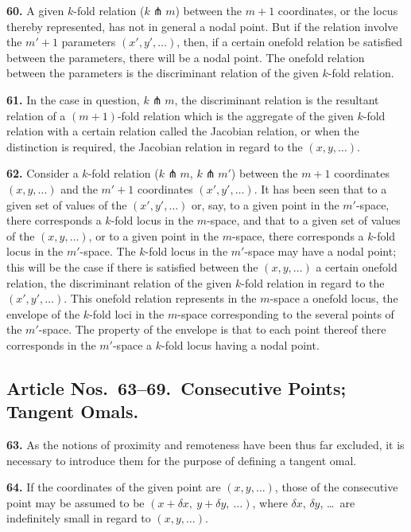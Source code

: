 \documentclass[11pt,a4paper]{article}
\theoremstyle{definition}
\begin{document}
\noindent\textbf{60.} A given $k$-fold relation ($k\pitchfork m$) between the $m+1$ coordinates, or the locus thereby represented, has not in general a nodal point. But if the relation involve the $m'+1$ parameters $(x',y',\ldots)$, then, if a certain onefold relation be satisfied between the parameters, there will be a nodal point. The onefold relation between the parameters is the discriminant relation of the given $k$-fold relation.

\noindent\textbf{61.} In the case in question, $k\pitchfork m$, the discriminant relation is the resultant relation of a $(m+1)$-fold relation which is the aggregate of the given $k$-fold relation with a certain relation called the Jacobian relation, or when the distinction is required, the Jacobian relation in regard to the $(x,y,\ldots)$.

\noindent\textbf{62.} Consider a $k$-fold relation ($k\pitchfork m$, $k\pitchfork m'$) between the $m+1$ coordinates $(x,y,\ldots)$ and the $m'+1$ coordinates $(x',y',\ldots)$. It has been seen that to a given set of values of the $(x',y',\ldots)$ or, say, to a given point in the $m'$-space, there corresponds a $k$-fold locus in the $m$-space, and that to a given set of values of the $(x,y,\ldots)$, or to a given point in the $m$-space, there corresponds a $k$-fold locus in the $m'$-space. The $k$-fold locus in the $m'$-space may have a nodal point; this will be the case if there is satisfied between the $(x,y,\ldots)$ a certain onefold relation, the discriminant relation of the given $k$-fold relation in regard to the $(x',y',\ldots)$. This onefold relation represents in the $m$-space a onefold locus, the envelope of the $k$-fold loci in the $m$-space corresponding to the several points of the $m'$-space. The property of the envelope is that to each point thereof there corresponds in the $m'$-space a $k$-fold locus having a nodal point.

\subsection*{Article Nos.\ 63--69.\ Consecutive Points; Tangent Omals.}

\setcounter{page}{468}

\noindent\textbf{63.} As the notions of proximity and remoteness have been thus far excluded, it is necessary to introduce them for the purpose of defining a tangent omal.

\noindent\textbf{64.} If the coordinates of the given point are $(x,y,\ldots)$, those of the consecutive point may be assumed to be $(x+\delta x,\ y+\delta y,\ \ldots)$, where $\delta x$, $\delta y$, \ldots\ are indefinitely small in regard to $(x,y,\ldots)$.
\end{document}
